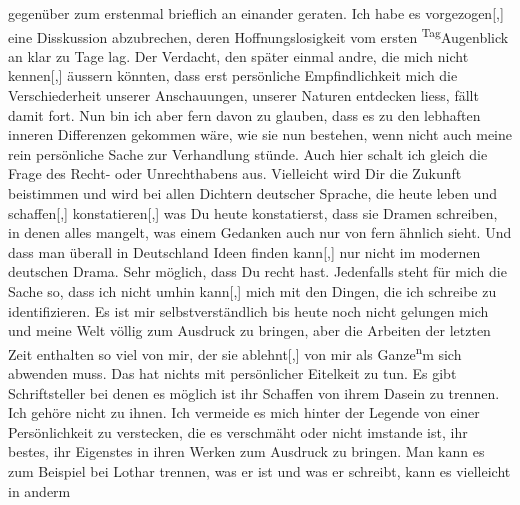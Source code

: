 \begin{ledgroupsized}[t]{13cm}
{{{               }}}\label{K_L03520-2h} gegenüber zum erstenmal brieflich an einander geraten. Ich habe es
                  vorgezogen{[},{]} eine Disskussion abzubrechen, deren
               Hoffnungslosigkeit vom ersten \substVorne{}\textsuperscript{Tag}\substDazwischen{}Augenblick\substHinten{} an klar zu Tage lag. Der Verdacht, den später einmal andre, die mich nicht
                  kennen{[},{]} äussern könnten, dass erst persönliche
               Empfindlichkeit mich die Verschiederheit unserer Anschauungen\introOben{},\introOben{} unserer Naturen entdecken liess, fällt damit fort. Nun bin ich aber fern
               davon zu glauben, dass es zu den lebhaften inneren Differenzen gekommen wäre, wie sie
               nun bestehen, wenn nicht auch meine rein persönliche Sache zur Verhandlung stünde.
               Auch hier schalt ich gleich die Frage des Recht- oder Unrechthabens aus. Vielleicht
               wird Dir die Zukunft beistimmen und wird bei allen Dichtern deutscher Sprache, die
               heute leben und schaffen{[},{]} konstatieren{[},{]} was
               Du heute konstatierst, dass sie Dramen schreiben, in denen alles mangelt, {\pb}was einem Gedanken auch nur von fern
               ähnlich sieht. Und dass man überall in Deutschland Ideen finden kann{[},{]} nur nicht im modernen
               deutschen Drama. Sehr möglich, dass Du recht hast. Jedenfalls steht für mich die
               Sache so, dass ich nicht umhin kann{[},{]} mich mit den Dingen, die
               ich schreibe zu identifizieren. Es ist mir selbstverständlich bis heute noch nicht
               gelungen mich und meine Welt völlig zum Ausdruck zu bringen, aber die Arbeit\introOben{}en\introOben{} der letzten Zeit enthalten so viel von mir, \label{T_L03520-4v}\label{T_L03520-4h} der sie
                  ablehnt{[},{]} von mir als Ganze\substVorne{}\textsuperscript{n}\substDazwischen{}m\substHinten{} sich abwenden muss. Das hat nichts mit persönlicher Eitelkeit zu tun. Es
               gibt Schriftsteller bei denen es möglich ist ihr Schaffen von ihrem Dasein zu
               trennen. Ich gehöre nicht zu ihnen. Ich vermeide es mich hinter der Legende von einer
               Persönlichkeit zu verstecken, die es verschmäht oder nicht imstande ist, ihr bestes,
               ihr Eigenstes in ihren Werken zum Ausdruck zu bringen. Man kann es zum Beispiel {\pb}bei Lothar trennen, was er ist und was er schreibt, kann es vielleicht in anderm

\end{ledgroupsized}

